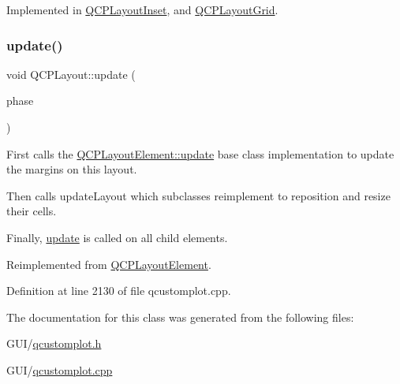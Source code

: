 Implemented in \hyperlink{class_q_c_p_layout_inset_ad6756a3b507e20496aaf7f5ca16c47d1}{Q\+C\+P\+Layout\+Inset}, and \hyperlink{class_q_c_p_layout_grid_acc1277394ff8a6432e111ff9463e6375}{Q\+C\+P\+Layout\+Grid}.

\mbox{\label{class_q_c_p_layout_a34ab477e820537ded7bade4399c482fd}} 
\subsubsection{\texorpdfstring{update()}{update()}}
{\footnotesize\ttfamily void Q\+C\+P\+Layout\+::update (\begin{DoxyParamCaption}\item[{\hyperlink{class_q_c_p_layout_element_a0d83360e05735735aaf6d7983c56374d}{Update\+Phase}}]{phase }\end{DoxyParamCaption})\hspace{0.3cm}{\ttfamily [virtual]}}

First calls the \hyperlink{class_q_c_p_layout_element_a929c2ec62e0e0e1d8418eaa802e2af9b}{Q\+C\+P\+Layout\+Element\+::update} base class implementation to update the margins on this layout.

Then calls update\+Layout which subclasses reimplement to reposition and resize their cells.

Finally, \hyperlink{class_q_c_p_layout_a34ab477e820537ded7bade4399c482fd}{update} is called on all child elements. 

Reimplemented from \hyperlink{class_q_c_p_layout_element_a929c2ec62e0e0e1d8418eaa802e2af9b}{Q\+C\+P\+Layout\+Element}.



Definition at line 2130 of file qcustomplot.\+cpp.



The documentation for this class was generated from the following files\+:\begin{DoxyCompactItemize}
\item 
G\+U\+I/\hyperlink{qcustomplot_8h}{qcustomplot.\+h}\item 
G\+U\+I/\hyperlink{qcustomplot_8cpp}{qcustomplot.\+cpp}\end{DoxyCompactItemize}
